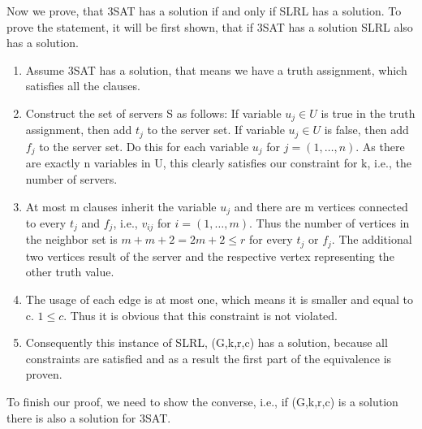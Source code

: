 \documentclass [12pt]{article}
\begin{document}
Now we prove, that 3SAT has a solution if and only if SLRL has a solution. 
To prove the statement, it will be first shown, that if 3SAT has a solution SLRL also has a solution.
\begin{enumerate}
  \item{Assume 3SAT has a solution, that means we have a truth assignment, 
    which satisfies all the clauses.}
  \item{Construct the set of servers S as follows: If variable $u_j \in U$ is true
      in the truth assignment, then add $t_j$ to the server set. If variable $u_j \in U$
      is false, then add $f_j$ to the server set. Do this for each variable $u_j$ for $j = (1,\dots,n)$.
      As there are exactly n variables in U, this clearly satisfies our constraint 
    for k, i.e., the number of servers.}
  \item{At most m clauses inherit the variable $u_j$ and there are m vertices connected to every
      $t_j$ and $f_j$, i.e., $v_{ij}$ for $i=(1,\dots,m)$.
      Thus the number of vertices in the neighbor set is $m+m+2 = 2m+2 \leq r $ for every 
      $t_j$ or $f_j$. The additional two vertices result of the server and the respective 
    vertex representing the other truth value.}
  \item{The usage of each edge is at most one, which means it is smaller and equal to c. $1\leq c$.
    Thus it is obvious that this constraint is not violated.}
  \item{Consequently this instance of SLRL, (G,k,r,c) has a solution, because all constraints are satisfied 
    and as a result the first part of the equivalence is proven.}
\end{enumerate}
To finish our proof, we need to show the converse, i.e., 
if (G,k,r,c) is a solution there is also a solution for 3SAT. 
\end{document}
